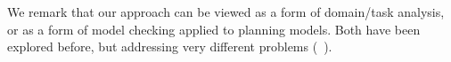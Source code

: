 

We remark that our approach can be viewed as a form of domain/task
analysis, or as a form of model checking applied to planning
models. Both have been explored before, but addressing very different
problems
(\eg\ \cite{fox:long:jair-98,rintanen:aaai-00,vaquero:etal:keq-13}).
%
%



















